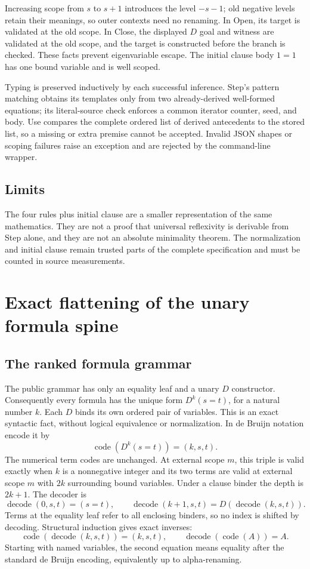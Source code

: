 Increasing scope from \(s\) to \(s+1\) introduces the level \(-s-1\);
old negative levels retain their meanings, so outer contexts need no
renaming. In Open, its target is validated at the old scope. In Close,
the displayed \(D\) goal and witness are validated at the old scope, and
the target is constructed before the branch is checked. These facts
prevent eigenvariable escape. The initial clause body \(1=1\) has one
bound variable and is well scoped.

Typing is preserved inductively by each successful inference. Step's
pattern matching obtains its templates only from two already-derived
well-formed equations; its literal-source check enforces a common
iterator counter, seed, and body. Use compares the complete ordered list
of derived antecedents to the stored list, so a missing or extra premise
cannot be accepted. Invalid JSON shapes or scoping failures raise an
exception and are rejected by the command-line wrapper.

\subsection{Limits}
The four rules plus initial clause are a smaller representation of the
same mathematics. They are not a proof that universal reflexivity is
derivable from Step alone, and they are not an absolute minimality
theorem. The normalization and initial clause remain trusted parts of
the complete specification and must be counted in source measurements.


\section{Exact flattening of the unary formula spine}
\subsection{The ranked formula grammar}
The public grammar has only an equality leaf and a unary \(D\) constructor.
Consequently every formula has the unique form \(D^k(s=t)\), for a natural
number \(k\). Each \(D\) binds its own ordered pair of variables. This is
an exact syntactic fact, without logical equivalence or normalization.
In de Bruijn notation encode it by
\[
 \operatorname{code}(D^k(s=t))=(k,s,t).
\]
The numerical term codes are unchanged. At external scope \(m\), this
triple is valid exactly when \(k\) is a nonnegative integer and its two
terms are valid at external scope \(m\) with \(2k\) surrounding bound
variables. Under a clause binder the depth is \(2k+1\).
The decoder is
\[
 \operatorname{decode}(0,s,t)=(s=t),\qquad
 \operatorname{decode}(k+1,s,t)=D(\operatorname{decode}(k,s,t)).
\]
Terms at the equality leaf refer to all enclosing binders, so no index
is shifted by decoding. Structural induction gives exact inverses:
\[
 \operatorname{code}(\operatorname{decode}(k,s,t))=(k,s,t),\qquad
 \operatorname{decode}(\operatorname{code}(A))=A.
\]
Starting with named variables, the second equation means equality after
the standard de Bruijn encoding, equivalently up to alpha-renaming.

